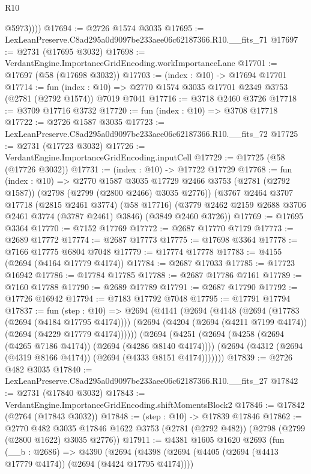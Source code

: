 \begin{lexlean}{R10}
\begin{coremodule}
            @5973))))
@17694 := @2726 @1574 @3035
@17695 := LexLeanPreserve.C8ad295a0d9097be233aee06c62187366.R10.__fits_71
@17697 := @2731 (@17695 @3032)
@17698 := VerdantEngine.ImportanceGridEncoding.workImportanceLane
@17701 := @17697 (@58 (@17698 @3032))
@17703 := (index : @10) -> @17694 @17701
@17714 := fun (index : @10) =>
  @2770 @1574 @3035 @17701 @2349 @3753 (@2781 (@2792 @1574)) @7019 @7041
@17716 := @3718 @2460 @3726
@17718 := @3709 @17716 @3732
@17720 := fun (index : @10) => @3708 @17718
@17722 := @2726 @1587 @3035
@17723 := LexLeanPreserve.C8ad295a0d9097be233aee06c62187366.R10.__fits_72
@17725 := @2731 (@17723 @3032)
@17726 := VerdantEngine.ImportanceGridEncoding.inputCell
@17729 := @17725 (@58 (@17726 @3032))
@17731 := (index : @10) -> @17722 @17729
@17768 := fun (index : @10) =>
  @2770
    @1587
    @3035
    @17729
    @2466
    @3753
    (@2781 (@2792 @1587))
    (@2798 (@2799 (@2800 @2466) @3035 @2776))
    (@3767
      @2464
      @3707
      @17718
      (@2815 @2461 @3774)
      (@58 @17716)
      (@3779 @2462 @2159 @2688 @3706 @2461 @3774 (@3787 @2461) @3846)
      (@3849 @2460 @3726))
@17769 := @17695 @3364
@17770 := @7152 @17769
@17772 := @2687 @17770 @7179
@17773 := @2689 @17772
@17774 := @2687 @17773
@17775 := @17698 @3364
@17778 := @7166 @17775 @6804 @7048
@17779 := @17774 @17778
@17783 := @4155 (@2694 (@4164 @17779 @4174))
@17784 := @2687 @17033
@17785 := @17723 @16942
@17786 := @17784 @17785
@17788 := @2687 @17786 @7161
@17789 := @7160 @17788
@17790 := @2689 @17789
@17791 := @2687 @17790
@17792 := @17726 @16942
@17794 := @7183 @17792 @7048
@17795 := @17791 @17794
@17837 := fun (step : @10) =>
  @2694
    (@4141
      (@2694
        (@4148
          (@2694 (@17783 (@2694 (@4184 @17795 @4174))))
          (@2694 (@4204 (@2694 (@4211 @7199 @4174)) (@2694 (@4229 @17779 @4174))))))
      (@2694
        (@4251
          (@2694 (@4258 (@2694 (@4265 @7186 @4174)) (@2694 (@4286 @8140 @4174))))
          (@2694 (@4312 (@2694 (@4319 @8166 @4174)) (@2694 (@4333 @8151 @4174)))))))
@17839 := @2726 @482 @3035
@17840 := LexLeanPreserve.C8ad295a0d9097be233aee06c62187366.R10.__fits_27
@17842 := @2731 (@17840 @3032)
@17843 := VerdantEngine.ImportanceGridEncoding.shiftMomentsBlock2
@17846 := @17842 (@2764 (@17843 @3032))
@17848 := (step : @10) -> @17839 @17846
@17862 := @2770
    @482
    @3035
    @17846
    @1622
    @3753
    (@2781 (@2792 @482))
    (@2798 (@2799 (@2800 @1622) @3035 @2776))
@17911 := @4381
    @1605
    @1620
    @2693
    (fun (__b : @2686) =>
    @4390
      (@2694
        (@4398
          (@2694 (@4405 (@2694 (@4413 @17779 @4174)) (@2694 (@4424 @17795 @4174))))

\end{coremodule}
\end{lexlean}
